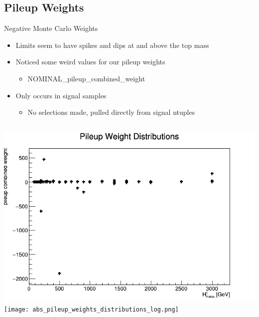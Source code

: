 \documentclass[aspectratio=169,xcolor=table]{beamer}
\begin{document}
  \subsection{Pileup Weights}

    \begin{frame}[t]{Negative Monte Carlo Weights}
      \begin{itemize}
        \item Limits seem to have spikes and dips at and above the top mass
        \item Noticed some weird values for our pileup weights
        \begin{itemize}
          \item NOMINAL\_pileup\_combined\_weight
        \end{itemize}
        \item Only occurs in signal samples
        \begin{itemize}
          \item No selections made, pulled directly from signal ntuples
        \end{itemize}
      \end{itemize}
      \vspace{1cm}
      \begin{columns}
        \centering
        \includegraphics[width=\textwidth,keepaspectratio=true]{pileup_distributions.png}
        \centering
        \texttt{[image: abs\_pileup\_weights\_distributions\_log.png]}
        \centering

\end{columns}
\end{frame}
\end{document}
